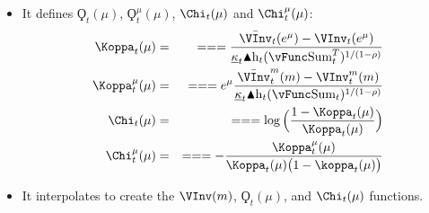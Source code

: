 \documentclass[titlepage,abstract]{\econtex}
\providecommand{\vSum}{\vFunc\text{Sum}}
\providecommand{\Deltah}{\blacktriangle \mathrm{h}}
\begin{document}
\begin{itemize}
        \item It defines $\ensuremath{\Koppa}_{t}(\mu)$, $\ensuremath{\Koppa}_{t}^{\mu}(\mu)$, $\Chi_{t}(\mu)$ and $\Chi_{t}^{\mu}(\mu)$:
            \begin{equation}\begin{gathered}\begin{aligned}
            \Koppa_{t} (\mu)    &=& =  =  =  \frac{\bar{\VInv}_{t} (e^{\mu}) -\VInv_{t} (e^{\mu})}{\underline{\kappa}_{t} \Deltah_{t} (\vSum_{t}^{T})^{1/(1-\rho)}} \\
            \Koppa_{t}^{\mu} (\mu)    &=& =  =  =  e^{\mu} \frac{\bar{\VInv}_{t}^{m} (m)- \VInv_{t}^{m} (m)}{\underline{\kappa}_{t} \Deltah_{t} (\vSum_{t})^{1/(1-\rho)}} \\
            \Chi_{t} (\mu)    &=& =  =  =  \log\Big(\frac{1-\Koppa_{t} (\mu)}{\Koppa_{t} (\mu) }\Big) \\
            \Chi_{t}^{\mu} (\mu)    &=& =  =  =  -\frac{\Koppa_{t}^{\mu}(\mu)}{\Koppa_{t} (\mu)\big(1-\koppa_{t} (\mu)\big)}
            \end{aligned}\end{gathered}\end{equation}
        \item It interpolates to create the $\VInv(m)$, $\ensuremath{\Koppa}_{t}(\mu)$, and $\Chi_{t}(\mu)$ functions.
        \end{itemize}
\end{document}
